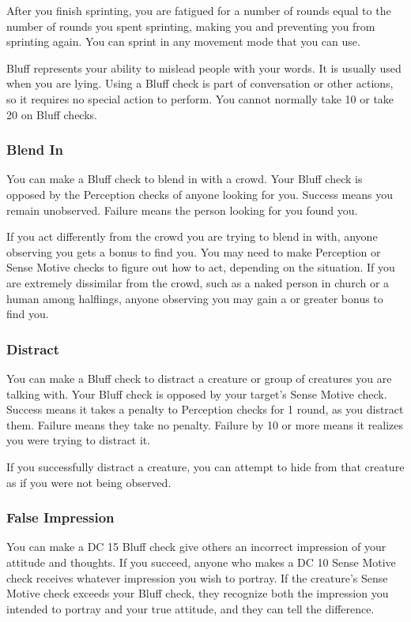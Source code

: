 After you finish sprinting, you are fatigued for a number of rounds equal to the number of rounds you spent sprinting, making you \vulnerable and preventing you from sprinting again. You can sprint in any movement mode that you can use.

Bluff represents your ability to mislead people with your words. It is usually used when you are lying. Using a Bluff check is part of conversation or other actions, so it requires no special action to perform. You cannot normally take 10 or take 20 on Bluff checks.

\subsubsection{Blend In}
You can make a Bluff check to blend in with a crowd. Your Bluff check is opposed by the Perception checks of anyone looking for you. Success means you remain unobserved. Failure means the person looking for you found you.

If you act differently from the crowd you are trying to blend in with, anyone observing you gets a  bonus to find you. You may need to make Perception or Sense Motive checks to figure out how to act, depending on the situation. If you are extremely dissimilar from the crowd, such as a naked person in church or a human among halflings, anyone observing you may gain a  or greater bonus to find you. 

\subsubsection{Distract}
You can make a Bluff check to distract a creature or group of creatures you are talking with. Your Bluff check is opposed by your target's Sense Motive check. Success means it takes a  penalty to Perception checks for 1 round, as you distract them. Failure means they take no penalty. Failure by 10 or more means it realizes you were trying to distract it.

If you successfully distract a creature, you can attempt to hide from that creature as if you were not being observed.

\subsubsection{False Impression}
You can make a DC 15 Bluff check give others an incorrect impression of your attitude and thoughts. If you succeed, anyone who makes a DC 10 Sense Motive check receives whatever impression you wish to portray. If the creature's Sense Motive check exceeds your Bluff check, they recognize both the impression you intended to portray and your true attitude, and they can tell the difference.

